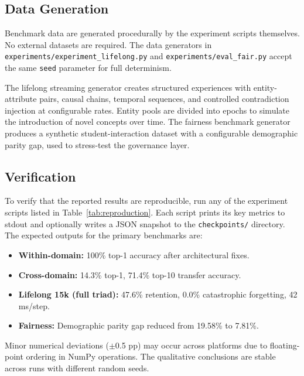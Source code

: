 \documentclass[11pt]{article}
\begin{document}
\subsection{Data Generation}
Benchmark data are generated procedurally by the experiment scripts themselves. No external datasets are required. The data generators in \texttt{experiments/experiment\_lifelong.py} and \texttt{experiments/eval\_fair.py} accept the same \texttt{seed} parameter for full determinism.

The lifelong streaming generator creates structured experiences with entity-attribute pairs, causal chains, temporal sequences, and controlled contradiction injection at configurable rates. Entity pools are divided into epochs to simulate the introduction of novel concepts over time. The fairness benchmark generator produces a synthetic student-interaction dataset with a configurable demographic parity gap, used to stress-test the governance layer.

\subsection{Verification}
To verify that the reported results are reproducible, run any of the experiment scripts listed in Table~\ref{tab:reproduction}. Each script prints its key metrics to stdout and optionally writes a JSON snapshot to the \texttt{checkpoints/} directory. The expected outputs for the primary benchmarks are:

\begin{itemize}[leftmargin=*]
    \item \textbf{Within-domain:} 100\% top-1 accuracy after architectural fixes.
    \item \textbf{Cross-domain:} 14.3\% top-1, 71.4\% top-10 transfer accuracy.
    \item \textbf{Lifelong 15k (full triad):} 47.6\% retention, 0.0\% catastrophic forgetting, 42 ms/step.
    \item \textbf{Fairness:} Demographic parity gap reduced from 19.58\% to 7.81\%.
\end{itemize}

Minor numerical deviations ($\pm$0.5 pp) may occur across platforms due to floating-point ordering in NumPy operations. The qualitative conclusions are stable across runs with different random seeds.
\end{document}
